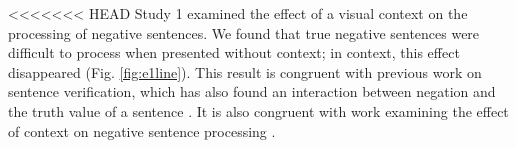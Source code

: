 \documentclass[10pt,letterpaper]{article}
\begin{document}




<<<<<<< HEAD
Study 1 examined the effect of a visual context on the processing of negative sentences.  We found that true negative sentences were difficult to process when presented without context; in context, this effect disappeared (Fig. \ref{fig:e1line}).  This result is congruent with previous work on sentence verification, which has also found an interaction between negation and the truth value of a sentence \cite{hclark1972, carpenter1975, just1971, just1976}.  It is also congruent with work examining the effect of context on negative sentence processing \cite{wason1965, glenberg1999, ludtke2006, nieuwland2008, dale2011}.  
\end{document}
